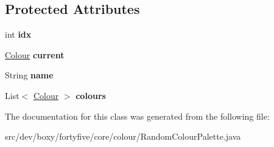 \subsection*{Protected Attributes}
\begin{DoxyCompactItemize}
\item 
\hypertarget{classdev_1_1boxy_1_1fortyfive_1_1core_1_1colour_1_1_random_colour_palette_a571b9cde56380c426661f680e5a173f8}{
int {\bfseries idx}}
\label{df/d90/classdev_1_1boxy_1_1fortyfive_1_1core_1_1colour_1_1_random_colour_palette_a571b9cde56380c426661f680e5a173f8}

\item 
\hypertarget{classdev_1_1boxy_1_1fortyfive_1_1core_1_1colour_1_1_random_colour_palette_adf79000946ee6200102849699ea7f686}{
\hyperlink{classdev_1_1boxy_1_1fortyfive_1_1core_1_1colour_1_1_colour}{Colour} {\bfseries current}}
\label{df/d90/classdev_1_1boxy_1_1fortyfive_1_1core_1_1colour_1_1_random_colour_palette_adf79000946ee6200102849699ea7f686}

\item 
\hypertarget{classdev_1_1boxy_1_1fortyfive_1_1core_1_1colour_1_1_random_colour_palette_a132a087c45033b7823788cc9196c4182}{
String {\bfseries name}}
\label{df/d90/classdev_1_1boxy_1_1fortyfive_1_1core_1_1colour_1_1_random_colour_palette_a132a087c45033b7823788cc9196c4182}

\item 
\hypertarget{classdev_1_1boxy_1_1fortyfive_1_1core_1_1colour_1_1_random_colour_palette_a7c13be6bc8f67df8e3c116263724cfe6}{
List$<$ \hyperlink{classdev_1_1boxy_1_1fortyfive_1_1core_1_1colour_1_1_colour}{Colour} $>$ {\bfseries colours}}
\label{df/d90/classdev_1_1boxy_1_1fortyfive_1_1core_1_1colour_1_1_random_colour_palette_a7c13be6bc8f67df8e3c116263724cfe6}

\end{DoxyCompactItemize}


The documentation for this class was generated from the following file:\begin{DoxyCompactItemize}
\item 
src/dev/boxy/fortyfive/core/colour/RandomColourPalette.java\end{DoxyCompactItemize}
